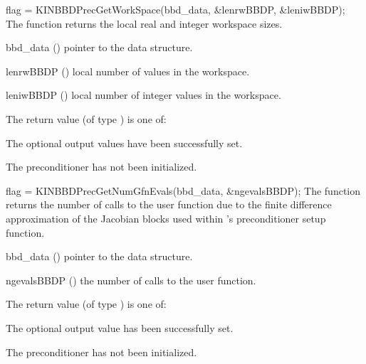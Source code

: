{
  flag = KINBBDPrecGetWorkSpace(bbd\_data, \&lenrwBBDP, \&leniwBBDP);
}
{
  The function  returns the local
  {\kinbbdpre} real and integer workspace sizes.
}
{
  \begin{args}[lenrwBBDP]
  \item[bbd\_data] ()
    pointer to the {\kinbbdpre} data structure.
  \item[lenrwBBDP] ()
    local number of  values in the {\kinbbdpre} workspace.
  \item[leniwBBDP] ()
    local number of integer values in the {\kinbbdpre} workspace.
  \end{args}
}
{
  The return value  (of type ) is one of:
  \begin{args}
  \item[\Id{KIN\_SUCCESS}] 
    The optional output values have been successfully set.
  \item[\Id{KIN\_PDATA\_NULL}]
    The {\kinbbdpre} preconditioner has not been initialized.
  \end{args}
}
{}
{
  flag = KINBBDPrecGetNumGfnEvals(bbd\_data, \&ngevalsBBDP);
}
{
  The function  returns the
  number of calls to the user  function due to the 
  finite difference approximation of the Jacobian blocks used within
  {\kinbbdpre}'s preconditioner setup function.
}
{
  \begin{args}[ngevalsBBDP]
  \item[bbd\_data] ()
    pointer to the {\kinbbdpre} data structure.
  \item[ngevalsBBDP] ()
    the number of calls to the user  function.
  \end{args}
}
{
  The return value  (of type ) is one of:
  \begin{args}
  \item[\Id{KIN\_SUCCESS}] 
    The optional output value has been successfully set.
  \item[\Id{KIN\_PDATA\_NULL}]
    The {\kinbbdpre} preconditioner has not been initialized.
  \end{args}
}
{}


